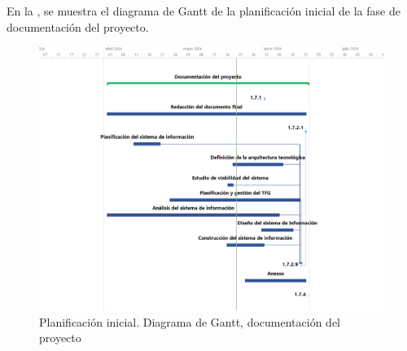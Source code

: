 En la , se muestra el diagrama de Gantt de la planificación inicial de la fase de documentación del proyecto.
\begin{figure}[H]
    \hypertarget{fig:5_PI-Gantt-Documentacion}{}
    \centering
    \includegraphics[width=1\linewidth]{figures/5-Gantt/5-Gantt-Documentacion.png}
    \caption{Planificación inicial. Diagrama de Gantt, documentación del proyecto}
    \label{fig:5_PI-Gantt-Documentacion}
\end{figure}